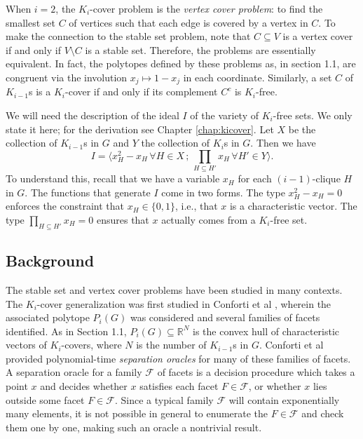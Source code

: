 When $i=2$, the $K_i$-cover problem is the \emph{vertex cover problem}: to find the smallest set $C$ of vertices such that each edge is covered by a vertex in $C$. 
To make the connection to the stable set problem, note that $C \subseteq V$ is a vertex cover if and only if $V \setminus C$ is a stable set.
Therefore, the problems are essentially equivalent.
In fact, the polytopes defined by these problems as, in section 1.1, are congruent via the involution $x_j \mapsto 1-x_j$ in each coordinate.
Similarly, a set $C$ of $K_{i-1}$s is a $K_i$-cover if and only if its complement $C^c$ is $K_i$-free.

We will need the description of the ideal $I$ of the variety of $K_i$-free sets.
We only state it here; for the derivation see Chapter \ref{chap:kicover}.
Let $X$ be the collection of $K_{i-1}$s in $G$ and $Y$ the collection of $K_i$s in $G$.
Then we have
$$I = \langle x_H^2 - x_H\, \forall H \in X\, ;\,  \prod_{H \subseteq H'} x_H\, \forall H' \in Y \rangle.$$
To understand this, recall that we have a variable $x_H$ for each $(i-1)$-clique $H$ in $G$.
The functions that generate $I$ come in two forms.
The type $x_H^2 - x_H = 0$ enforces the constraint that $x_H \in \{0,1\}$, i.e., that $x$ is a characteristic vector.
The type $\prod_{H \subseteq H'} x_H= 0$ ensures that $x$ actually comes from a $K_i$-free set.

\subsection{Background}

The stable set and vertex cover problems have been studied in many contexts. 
The $K_i$-cover generalization was first studied in Conforti et al \cite{conforti}, wherein the associated polytope $P_i(G)$ was considered and several families of facets identified. 
As in Section 1.1, $P_i(G) \subseteq \mathbb{R}^N$ is the convex hull of characteristic vectors of $K_i$-covers, where $N$ is the number of $K_{i-1}$s in $G$. 
Conforti et al provided polynomial-time {\em separation oracles} for many of these families of facets. 
A separation oracle for a family $\mathcal{F}$ of facets is a decision procedure which takes a point $x$ and decides whether $x$ satisfies each facet $F \in \mathcal{F}$, or whether $x$ lies outside some facet $F \in \mathcal{F}$.
Since a typical family $\mathcal{F}$ will contain exponentially many elements, it is not possible in general to enumerate the $F \in \mathcal{F}$ and check them one by one, making such an oracle a nontrivial result.


